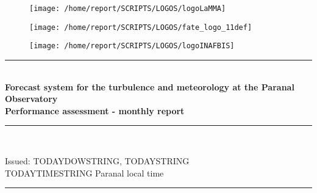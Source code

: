 \documentclass[11pt,english]{article}
\newcommand{\HRule}{\rule{\linewidth}{0.5mm}}
\begin{document}
\begin{figure}
\begin{center}
\hspace{1.5cm}
\parbox{5.5cm}{\texttt{[image: /home/report/SCRIPTS/LOGOS/logoLaMMA]}}
\hspace{.3cm}
\parbox{5.5cm}{\texttt{[image: /home/report/SCRIPTS/LOGOS/fate\_logo\_11def]}}
\hspace{.3cm}
\parbox{5.5cm}{\texttt{[image: /home/report/SCRIPTS/LOGOS/logoINAFBIS]}}
\hspace{.1cm}
\vspace{1.2cm}
\end{center}
\end{figure}

\begin{center}
\HRule \\[0.4cm]
\Huge{\textbf{Forecast system for the turbulence and meteorology at the Paranal Observatory}}
\\[0.4cm]
\LARGE{\textbf{Performance assessment - monthly report}}
\HRule \\[0.4cm]
\end{center}

\begin{center}
\vspace{2cm}\Huge{Issued: TODAYDOWSTRING, TODAYSTRING\\ TODAYTIMESTRING Paranal local time}
\HRule \\[0.1cm]
\end{center}

\clearpage
\end{document}
